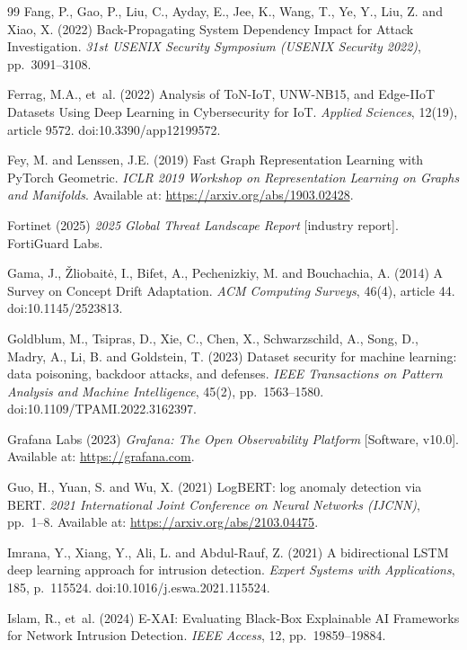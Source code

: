 \documentclass[12pt,a4paper]{report}
\begin{document}
\begin{thebibliography}{99}
Fang, P., Gao, P., Liu, C., Ayday, E., Jee, K., Wang, T., Ye, Y., Liu, Z. and Xiao, X. (2022) Back-Propagating System Dependency Impact for Attack Investigation. \textit{31st USENIX Security Symposium (USENIX Security 2022)}, pp.~3091--3108.

Ferrag, M.A., et~al. (2022) Analysis of ToN-IoT, UNW-NB15, and Edge-IIoT Datasets Using Deep Learning in Cybersecurity for IoT. \textit{Applied Sciences}, 12(19), article 9572. doi:10.3390/app12199572.

Fey, M. and Lenssen, J.E. (2019) Fast Graph Representation Learning with PyTorch Geometric. \textit{ICLR 2019 Workshop on Representation Learning on Graphs and Manifolds}. Available at: \url{https://arxiv.org/abs/1903.02428}.

Fortinet (2025) \textit{2025 Global Threat Landscape Report} [industry report]. FortiGuard Labs.

Gama, J., \v{Z}liobait\.{e}, I., Bifet, A., Pechenizkiy, M. and Bouchachia, A. (2014) A Survey on Concept Drift Adaptation. \textit{ACM Computing Surveys}, 46(4), article 44. doi:10.1145/2523813.

Goldblum, M., Tsipras, D., Xie, C., Chen, X., Schwarzschild, A., Song, D., Madry, A., Li, B. and Goldstein, T. (2023) Dataset security for machine learning: data poisoning, backdoor attacks, and defenses. \textit{IEEE Transactions on Pattern Analysis and Machine Intelligence}, 45(2), pp.~1563--1580. doi:10.1109/TPAMI.2022.3162397.

Grafana Labs (2023) \textit{Grafana: The Open Observability Platform} [Software, v10.0]. Available at: \url{https://grafana.com}.

Guo, H., Yuan, S. and Wu, X. (2021) LogBERT: log anomaly detection via BERT. \textit{2021 International Joint Conference on Neural Networks (IJCNN)}, pp.~1--8. Available at: \url{https://arxiv.org/abs/2103.04475}.

Imrana, Y., Xiang, Y., Ali, L. and Abdul-Rauf, Z. (2021) A bidirectional LSTM deep learning approach for intrusion detection. \textit{Expert Systems with Applications}, 185, p.~115524. doi:10.1016/j.eswa.2021.115524.

Islam, R., et~al. (2024) E-XAI: Evaluating Black-Box Explainable AI Frameworks for Network Intrusion Detection. \textit{IEEE Access}, 12, pp.~19859--19884.


\end{thebibliography}
\end{document}
